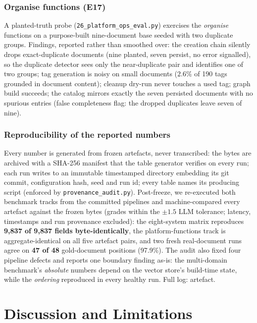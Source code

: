 \documentclass[sigconf, review, anonymous]{acmart}
\begin{document}
\subsubsection{Organise functions (E17)}\label{sec:ops}
A planted-truth probe (\texttt{26\_platform\_ops\_eval.py}) exercises the
\emph{organise} functions on a purpose-built nine-document base seeded with
two duplicate groups. Findings, reported rather than smoothed over: the
creation chain silently drops exact-duplicate documents (nine planted, seven
persist, no error signalled), so the duplicate detector sees only the
near-duplicate pair and identifies one of two groups; tag generation is noisy
on small documents ($2.6\%$ of 190 tags grounded in document content);
cleanup dry-run never touches a used tag; graph build succeeds; the catalog
mirrors exactly the seven persisted documents with no spurious entries (false
completeness flag: the dropped duplicates leave seven of nine).

\subsubsection{Reproducibility of the reported numbers}
Every number is generated from frozen artefacts, never transcribed: the bytes
are archived with a SHA-256 manifest that the table generator verifies on every
run; each run writes to an immutable timestamped directory embedding its git
commit, configuration hash, seed and run id; every table names its producing
script (enforced by \texttt{provenance\_audit.py}).
Post-freeze, we re-executed both benchmark tracks from the committed
pipelines and machine-compared every artefact
against the frozen bytes (grades within the $\pm1.5$ LLM tolerance; latency,
timestamps and run provenance excluded): the eight-system matrix reproduces
\textbf{9{,}837 of 9{,}837 fields byte-identically}, the platform-functions
track is aggregate-identical on all five artefact pairs, and two fresh
real-document runs agree on \textbf{47 of 48} gold-document positions
(97.9\%). The audit also fixed four pipeline defects and reports one boundary
finding as-is: the multi-domain benchmark's \emph{absolute} numbers depend on
the vector store's build-time state, while the \emph{ordering} reproduced in
every healthy run. Full log: artefact.

\section{Discussion and Limitations}\label{sec:conclusion}
\end{document}
